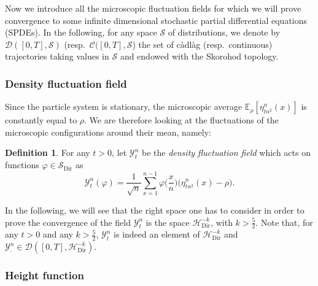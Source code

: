 \documentclass[10pt]{amsart}
\theoremstyle{definition}\newtheorem{defi}[theo]{Definition}\newtheorem{rema}[theo]{Remark}\newtheorem{exam}[theo]{Example}\newtheorem{exem}[theo]{Example}\newtheorem{nota}[theo]{Notation}
\DeclareMathOperator{\Dir}{Dir}
\newcommand{\bb}[1]{{\mathbb #1}}
\newcommand{\mc}[1]{{\mathcal #1}}
\renewcommand{\mc}[1]{{\mathcal #1}}
\renewcommand{\tfrac}{\frac}
\begin{document}
Now we introduce all the microscopic fluctuation fields for which we will prove convergence to some infinite dimensional stochastic partial differential equations (SPDEs). In the following, for any space $\mc S$ of distributions, we denote by $\mathcal{D}([0,T], \mc S)$ (resp.~$\mathcal C([0,T], \mc S$) the set of c\`adl\`ag (resp.~continuous) trajectories taking values in $\mc S$ and endowed with the Skorohod topology.

\subsubsection{Density fluctuation field}\label{ssec:density}

Since the particle system is stationary, the microscopic average $\bb E_\rho[\eta^n_{tn^2}(x)]$ is constantly equal to $\rho$. We are therefore looking at the fluctuations of the microscopic configurations around their mean, namely:

\begin{defi}
For any $t>0$, let $\mathcal{Y}^n_t$ be the \emph{density fluctuation
field} which acts on functions $\varphi\in \mc S_{\Dir}$ as
\begin{equation*}
\mathcal Y^n_t (\varphi) = \frac 1{\sqrt n} \sum_{x=1}^{n-1} \varphi\bigg(\tfrac x n\bigg)
\big(\eta^n_{tn^2}(x) - \rho\big).
\end{equation*}
\end{defi}

In the following, we will see that the right space one has to consider in order to prove the convergence of the field $\mc Y_t^n$ is the space $\mc H_{\Dir}^{-k}$, with $k>\frac52$. Note that, for any $t>0$ and any $k > \frac{5}{2}$, $\mc Y_t^n$ is indeed an element of $\mathcal{H}_{\Dir}^{-k}$ and $\mc Y^n_\cdot \in \mathcal{D}([0,T], \mathcal{H}_{\Dir}^{-k})$.


\subsubsection{Height function} \label{ssec:height}
\end{document}

